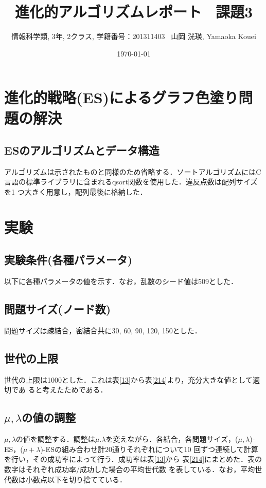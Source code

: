 \documentclass[a4j]{jarticle}
\title{進化的アルゴリズムレポート \ 課題3}
\author{情報科学類, 3年, 2クラス, 学籍番号：201311403 \ 山岡 洸瑛, Yamaoka
Kouei}
\date{\today}
\begin{document}
\maketitle
\section*{進化的戦略(ES)によるグラフ色塗り問題の解決}

\subsection*{ESのアルゴリズムとデータ構造}
アルゴリズムは示されたものと同様のため省略する．ソートアルゴリズムにはC
言語の標準ライブラリに含まれるqsort関数を使用した．違反点数は配列サイズを1
つ大きく用意し，配列最後に格納した．

\section*{実験}
\subsection*{実験条件(各種パラメータ)}
以下に各種パラメータの値を示す．なお，乱数のシード値は509とした．

\subsection*{問題サイズ(ノード数)}
問題サイズは疎結合，密結合共に30, 60, 90, 120, 150とした．

\subsection*{世代の上限}
世代の上限は1000とした．これは表\ref{13}から表\ref{214}より，充分大きな値として適切であ
ると考えたためである．

\subsection*{$\mu, \lambda$の値の調整}
$\mu, \lambda$の値を調整する．調整は$\mu. \lambda$を変えながら．各結合，各問題サイズ，($\mu,
\lambda$)-ES，($\mu + \lambda$)-ESの組み合わせ計20通りそれぞれについて10
回ずつ連続して計算を行い，その成功率によって行う．成功率は表\ref{13}から
表\ref{214}にまとめた．表の数字はそれぞれ成功率/成功した場合の平均世代数
を表している．なお，平均世代数は小数点以下を切り捨てている．
\end{document}

